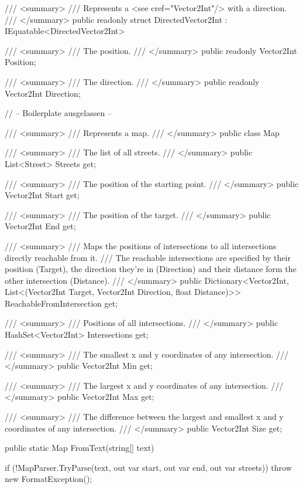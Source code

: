 \documentclass{article}
\begin{document}
\begin{lstcs}[]
/// <summary>
/// Represents a <see cref="Vector2Int"/> with a direction.
/// </summary>
public readonly struct DirectedVector2Int : IEquatable<DirectedVector2Int>
{
    /// <summary>
    /// The position.
    /// </summary>
    public readonly Vector2Int Position;

    /// <summary>
    /// The direction.
    /// </summary>
    public readonly Vector2Int Direction;

    // -- Boilerplate ausgelassen --
}
\end{lstcs}

\begin{lstcs}[]
/// <summary>
/// Represents a map.
/// </summary>
public class Map
{
    /// <summary>
    /// The list of all streets.
    /// </summary>
    public List<Street> Streets { get; }

    /// <summary>
    /// The position of the starting point.
    /// </summary>
    public Vector2Int Start { get; }

    /// <summary>
    /// The position of the target.
    /// </summary>
    public Vector2Int End { get; }

    /// <summary>
    /// Maps the positions of intersections to all intersections directly reachable from it.
    /// The reachable intersections are specified by their position (Target), the direction they're in (Direction) and their distance form the other intersection (Distance).
    /// </summary>
    public Dictionary<Vector2Int, List<(Vector2Int Target, Vector2Int Direction, float Distance)>> ReachableFromIntersection { get; }

    /// <summary>
    /// Positions of all intersections.
    /// </summary>
    public HashSet<Vector2Int> Intersections { get; }

    /// <summary>
    /// The smallest x and y coordinates of any intersection.
    /// </summary>
    public Vector2Int Min { get; }

    /// <summary>
    /// The largest x and y coordinates of any intersection.
    /// </summary>
    public Vector2Int Max { get; }

    /// <summary>
    /// The difference between the largest and smallest x and y coordinates of any intersection.
    /// </summary>
    public Vector2Int Size { get; }

    public static Map FromText(string[] text)
    {
        if (!MapParser.TryParse(text, out var start, out var end, out var streets)) throw new FormatException();

}}
\end{lstcs}
\end{document}
